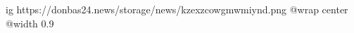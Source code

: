  
 
 
 
 

\ifcmt
  ig https://donbas24.news/storage/news/kzexzcowgmwmiynd.png
  @wrap center
  @width 0.9
\fi
